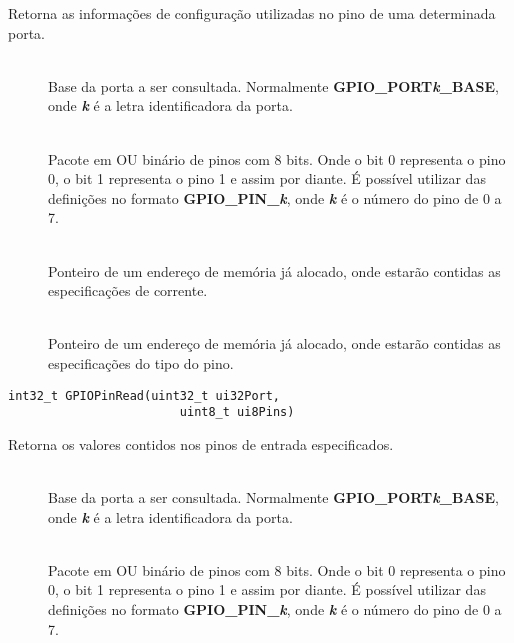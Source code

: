 Retorna as informações de configuração utilizadas no pino de uma determinada porta.

\begin{description}
	\item []\hfill \\
	Base da porta a ser consultada. Normalmente \textbf{GPIO\_PORT\emph{k}\_BASE}, onde \textbf{\emph{k}} é a letra identificadora da porta.
	
	\item []\hfill \\
	Pacote em OU binário de pinos com 8 bits. Onde o bit 0 representa o pino 0, o bit 1 representa o pino 1 e assim por diante. É possível utilizar das definições no formato  \textbf{GPIO\_PIN\_\emph{k}}, onde \textbf{\emph{k}} é o número do pino de 0 a 7.
	
	\item []\hfill \\
	Ponteiro de um endereço de memória já alocado, onde estarão contidas as especificações de corrente.
	
	\item []\hfill \\
	Ponteiro de um endereço de memória já alocado, onde estarão contidas as especificações do tipo do pino.
\end{description}

\begin{lstlisting}[style=funcao]
	int32_t GPIOPinRead(uint32_t ui32Port,
						uint8_t ui8Pins)
\end{lstlisting}

Retorna os valores contidos nos pinos de entrada especificados.

\begin{description}
	\item []\hfill \\
	Base da porta a ser consultada. Normalmente \textbf{GPIO\_PORT\emph{k}\_BASE}, onde \textbf{\emph{k}} é a letra identificadora da porta.
	
	\item []\hfill \\
	Pacote em OU binário de pinos com 8 bits. Onde o bit 0 representa o pino 0, o bit 1 representa o pino 1 e assim por diante. É possível utilizar das definições no formato  \textbf{GPIO\_PIN\_\emph{k}}, onde \textbf{\emph{k}} é o número do pino de 0 a 7.
\end{description}


